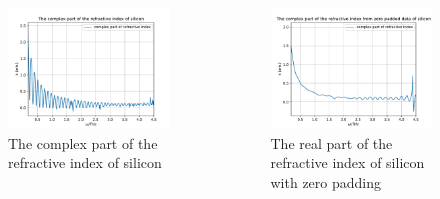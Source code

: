 \documentclass[aspectratio=1610, 9pt]{beamer}
\begin{document}
\begin{frame}
  \begin{center}
    \begin{columns}
      \begin{column}{0.5\textwidth}
        \begin{figure}
        \includegraphics[width=\textwidth]{silicon/THz_complex_index.pdf}
        \caption{The complex part of the refractive index of silicon}
        \end{figure}
      \end{column}
      \begin{column}{0.5\textwidth}
        \begin{figure}
        \includegraphics[width=\textwidth]{silicon/THz_complex_index_zero.pdf}
        \caption{The real part of the refractive index of silicon with zero padding}
        \end{figure}
      \end{column}
    \end{columns}
  \end{center}
\end{frame}
\end{document}

